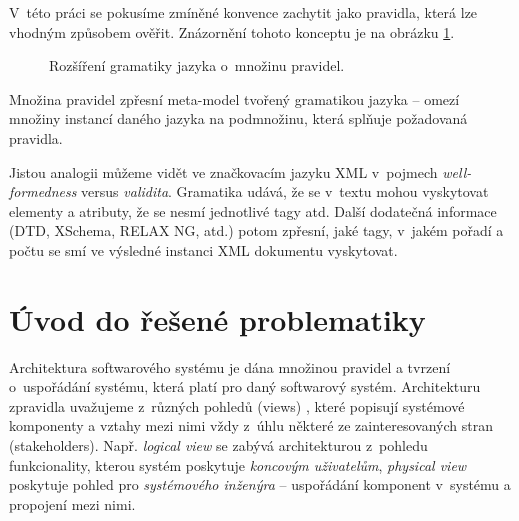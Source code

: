 V~této práci se pokusíme zmíněné konvence zachytit jako pravidla, která lze vhodným způsobem ověřit. Znázornění tohoto konceptu je na obrázku \ref{work_scope}.
\begin{figure}[h!]
  \centering
  \caption{Rozšíření gramatiky jazyka o~množinu pravidel.\label{work_scope}}
\end{figure}
Množina pravidel zpřesní meta-model tvořený gramatikou jazyka -- omezí množiny instancí daného jazyka na podmnožinu, která splňuje požadovaná pravidla.

Jistou analogii můžeme vidět ve značkovacím jazyku XML v~pojmech \emph{well-formedness} versus \emph{validita}. Gramatika udává, že se v~textu mohou vyskytovat elementy a atributy, že se nesmí  jednotlivé tagy atd. Další dodatečná informace (DTD, XSchema, RELAX NG, atd.) potom zpřesní, jaké tagy, v~jakém pořadí a počtu se smí ve výsledné instanci XML dokumentu vyskytovat.

\section{Úvod do řešené problematiky}

Architektura softwarového systému \cite{wiki:software_architecture} je dána množinou pravidel a tvrzení o~uspořádání systému, která platí pro daný softwarový systém. Architekturu zpravidla uvažujeme z~různých pohledů (views) \cite{wiki:four_plus_one_views}, které popisují systémové komponenty a vztahy mezi nimi vždy z~úhlu některé ze zainteresovaných stran (stakeholders). Např. \emph{logical view} se zabývá architekturou z~pohledu funkcionality, kterou systém poskytuje \emph{koncovým uživatelům}, \emph{physical view} poskytuje pohled pro \emph{systémového inženýra} -- uspořádání komponent v~systému a propojení mezi nimi.

